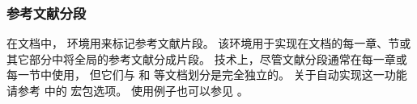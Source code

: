 \subsubsection{参考文献分段}%
\label{use:bib:seg}


在文档中， 环境用来标记参考文献片段。
该环境用于实现在文档的每一章、节或其它部分中将全局的参考文献分成片段。
技术上，尽管文献分段通常在每一章或每一节中使用，
但它们与  和  等文档划分是完全独立的。
关于自动实现这一功能请参考  中的  宏包选项。
使用例子也可以参见 。

